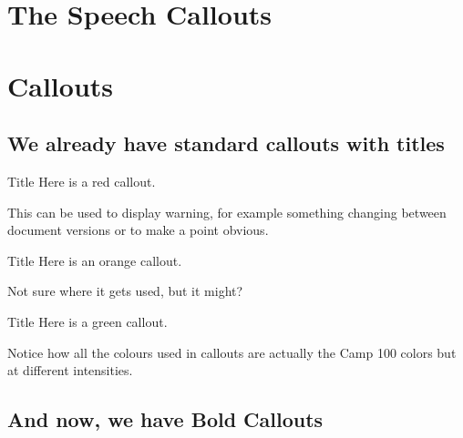 \documentclass[a4paper, 11pt]{report}
\begin{document}
\makedocumenttitlepage

\chapter{The Speech Callouts}

\chapter{Callouts}
\section{We already have standard callouts with titles}
\begin{callout-red}{Title}
Here is a red callout.

This can be used to display warning, for example something changing between document versions or to make a point obvious.
\end{callout-red}

\begin{callout-orange}{Title}
Here is an orange callout.

Not sure where it gets used, but it might?
\end{callout-orange}

\begin{callout-green}{Title}
Here is a green callout.

Notice how all the colours used in callouts are actually the Camp 100 colors but at different intensities. 
\end{callout-green}

\section{And now, we have Bold Callouts}
\end{document}
